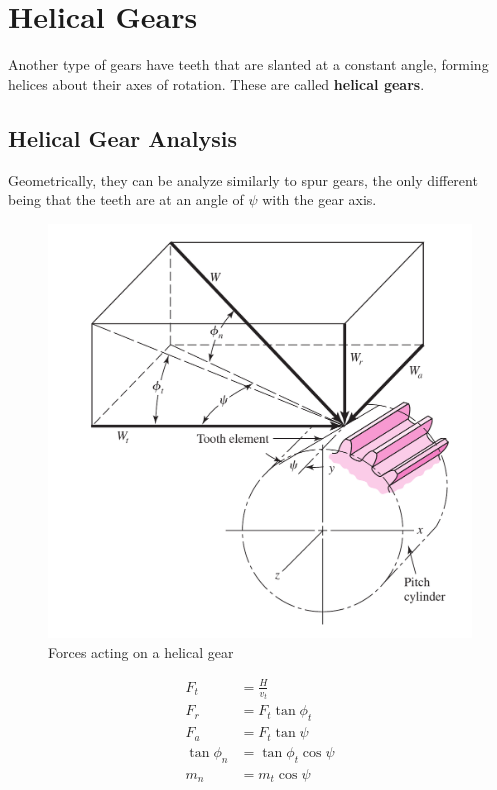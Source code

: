 \documentclass[a4paper,openany,svgnames]{kaobook}
\begin{document}
\chapter{Helical Gears}
\label{sec:orgf566bb1}

Another type of gears have teeth that are slanted at a constant angle, forming helices about their axes of rotation. These are called \textbf{helical gears}.


\section{Helical Gear Analysis}
\label{sec:org5b2d012}

Geometrically, they can be analyze similarly to spur gears, the only different being that the teeth are at an angle of \(\psi\) with the gear axis.

\begin{figure}[htbp]
\centering
\includegraphics[width=.9\linewidth]{./pictures/Gears/helical-gear-forces.png}
\caption{\label{fig: helical gear forces}Forces acting on a helical gear}
\end{figure}

\begin{align}
  F_{t} &= \frac{H}{v_{t}} \\
  F_{r} &= F_{t} \tan \phi_{t} \\
  F_{a} &= F_{t} \tan \psi \\
  \tan \phi_{n} &= \tan \phi_{t} \cos \psi \\
  m_{n} &= m_{t} \cos \psi
\end{align}
\end{document}
